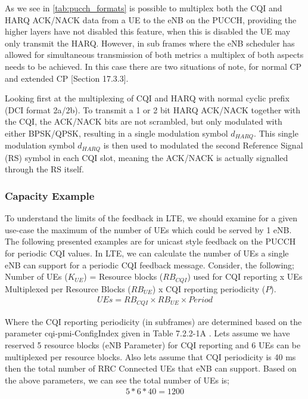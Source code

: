 \documentclass{article}
\begin{document}
As we see in \cref{tab:pucch_formats} is possible to multiplex both the CQI and HARQ ACK/NACK data from a UE to the eNB on the PUCCH, providing the higher layers have not disabled this feature, when this is disabled the UE may only transmit the HARQ. However, in sub frames where the eNB scheduler has allowed for simultaneous transmission of both metrics a multiplex of both aspects needs to be achieved. In this case there are two situations of note, for normal CP and extended CP \cite{umts_sesia}[Section 17.3.3]. 

Looking first at the multiplexing of CQI and HARQ with normal cyclic prefix (DCI format 2a/2b). To transmit a 1 or 2 bit HARQ ACK/NACK together with the CQI, the ACK/NACK bits are not scrambled, but only modulated with either BPSK/QPSK, resulting in a single modulation symbol $d_{HARQ}$.  This single modulation symbol $d_{HARQ}$ is then used to modulated the second Reference Signal (RS) symbol in each CQI slot, meaning the ACK/NACK is actually signalled through the RS itself.

\subsubsection{Capacity Example}
To understand the limits of the feedback in LTE, we should examine for a given use-case the maximum of the number of UEs which could be served by 1 \ac{eNB}. The following presented examples are for unicast style feedback on the \ac{PUCCH} for periodic CQI values. In LTE, we can calculate the number of UEs a single \ac{eNB} can support for a periodic CQI feedback message. Consider, the following; Number of UEs ($K_{UE}$) =  Resource blocks ($RB_{CQI}$) used for CQI reporting x UEs Multiplexed per Resource Blocks ($RB_{UE}$) x CQI reporting periodicity ($P$). 
    \begin{align}
        UEs = RB_{CQI} \times RB_{UE} \times Period
     \label{eq:pucch_capacity}
    \end{align}
    
Where the CQI reporting periodicity (in subframes) are determined based on the parameter cqi-pmi-ConfigIndex given in Table 7.2.2-1A \cite{ETSITS136213}. Lets assume we have reserved 5 resource blocks (eNB Parameter) for CQI reporting and 6 UEs can be multiplexed per resource blocks. Also lets assume that CQI periodicity is 40 ms then the total number of RRC Connected UEs that eNB can support. Based on the above parameters, we can see the total number of UEs is;
\begin{align}
    5 * 6 * 40 = 1200 
\end{align}
\end{document}
